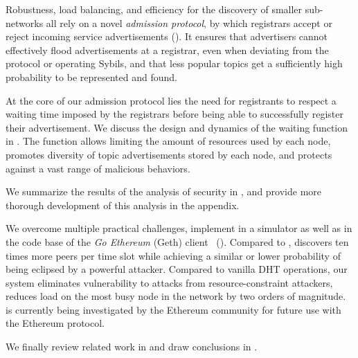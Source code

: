 Robustness, load balancing, and efficiency for the discovery of smaller sub-networks all rely on a novel \emph{admission protocol}, by which registrars accept or reject incoming service advertisements ().
It ensures that advertisers cannot effectively flood advertisements at a registrar, even when deviating from the protocol or operating Sybils, and that less popular topics get a sufficiently high probability to be represented and found.

At the core of our admission protocol lies the need for registrants to respect a waiting time imposed by the registrars before being able to successfully register their advertisement.
We discuss the design and dynamics of the waiting function in .
The function allows limiting the amount of resources used by each node, promotes diversity of topic advertisements stored by each node, and protects against a vast range of malicious behaviors.

We summarize the results of the analysis of \sysname security in , and provide more thorough development of this analysis in the appendix.

We overcome multiple practical challenges, implement \sysname in a simulator as well as in the code base of the \emph{Go Ethereum} (Geth) client~\cite{geth} ().
Compared to \discv, \sysname discovers ten times more peers per time slot while achieving a similar or lower probability of being eclipsed by a powerful attacker.
Compared to vanilla DHT operations, our system eliminates vulnerability to attacks from resource-constraint attackers, reduces load on the most busy node in the network by two orders of magnitude.
\sysname is currently being investigated by the Ethereum community for future use with the Ethereum protocol.

We finally review related work in  and draw conclusions in .
 